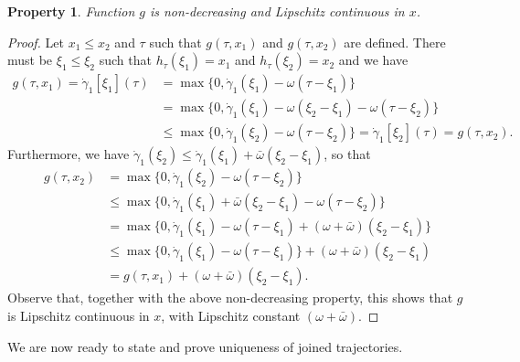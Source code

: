 \documentclass[a4paper]{article}
\theoremstyle{definition}
\theoremstyle{plain}
\newtheorem{property}{Property\hspace{0.25em}\ignorespaces}
\begin{document}
\begin{property}
  Function $g$ is non-decreasing and Lipschitz continuous in $x$.
\end{property}
\begin{proof}
  Let $x_{1} \leq x_{2}$ and $\tau$ such that $g(\tau, x_{1})$ and
  $g(\tau, x_{2})$ are defined. There must be $\xi_{1} \leq \xi_{2}$ such that
  $h_{\tau}(\xi_{1}) = x_{1}$ and $h_{\tau}(\xi_{2}) = x_{2}$ and we have
  \begin{align*}
    g(\tau, x_{1}) = \dot{\gamma}_{1}[\xi_{1}](\tau)
    &= \max\{0, \dot{\gamma}_{1}(\xi_{1}) - \omega(\tau - \xi_{1}) \} \\
    &= \max\{0, \dot{\gamma}_{1}(\xi_{1}) - \omega(\xi_{2} - \xi_{1}) - \omega(\tau - \xi_{2}) \} \\
    &\leq \max\{0, \dot{\gamma}_{1}(\xi_{2}) - \omega(\tau - \xi_{2}) \}
    = \dot{\gamma}_{1}[\xi_{2}](\tau) = g(\tau, x_{2}) .
  \end{align*}
  Furthermore, we have
  $\dot{\gamma}_{1}(\xi_{2}) \leq \dot{\gamma}_{1}(\xi_{1}) + \bar{\omega}(\xi_{2} - \xi_{1})$,
  so that
  \begin{align*}
    g(\tau, x_{2}) &= \max\{0, \dot{\gamma}_{1}(\xi_{2}) - \omega(\tau - \xi_{2}) \} \\
              &\leq \max\{0, \dot{\gamma}_{1}(\xi_{1}) + \bar{\omega}(\xi_{2} - \xi_{1}) - \omega(\tau - \xi_{2}) \} \\
              &= \max\{0, \dot{\gamma}_{1}(\xi_{1}) - \omega(\tau-\xi_{1}) + (\omega + \bar{\omega})(\xi_{2} - \xi_{1}) \} \\
              &\leq \max\{0, \dot{\gamma}_{1}(\xi_{1}) - \omega(\tau - \xi_{1}) \} + (\omega + \bar{\omega})(\xi_{2} - \xi_{1}) \\
              &= g(\tau, x_{1}) + (\omega + \bar{\omega})(\xi_{2} - \xi_{1}) .
  \end{align*}
  Observe that, together with the above non-decreasing property, this shows that
  $g$ is Lipschitz continuous in $x$, with Lipschitz constant
  $(\omega + \bar{\omega})$.
\end{proof}

We are now ready to state and prove uniqueness of joined trajectories.
\end{document}
